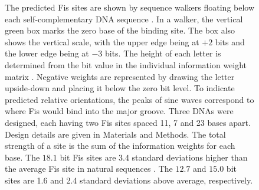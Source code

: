 \documentclass[doublespacing]{narfront}
\begin{document}
\begin{figure}[ht]
The predicted Fis sites are shown by sequence walkers
floating below each self-complementary DNA sequence
\cite{Schneider.walker,Hengen.fisinfo}.
In a walker, the vertical
green box marks the zero base of the binding site.
The box also shows the vertical scale, with the upper edge being at $+2$ bits
and the lower edge being at $-3$ bits.
The height of each letter
is determined from the bit value
in the
individual information weight matrix
\cite{Schneider.Ri,Schneider.walker,Hengen.fisinfo}.
Negative weights are represented by drawing the letter
upside-down
and placing it below the zero bit level.
To indicate predicted relative orientations,
the peaks of sine waves correspond to where Fis
would bind into the major groove.
Three DNAs were designed, each having
two Fis sites spaced 11, 7 and 23 bases apart.
Design details are given in Materials and Methods.
The total strength of a site is the sum of the information weights for each
base.
The $18.1$ bit Fis sites are
3.4
standard deviations
higher than the average Fis site
in natural sequences \cite{Hengen.fisinfo,Schneider.Ri}.
The
$12.7$ and $15.0$ bit sites are
1.6 and 2.4
standard deviations above average, respectively.
\label{fig.sequences-overlap}
\end{figure} %
\end{document}
